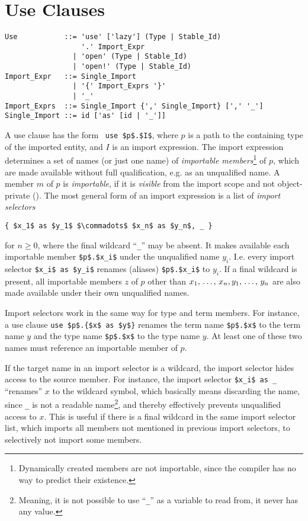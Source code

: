 \section{Use Clauses}
\label{sec:use-clauses}

\syntax\begin{lstlisting}
Use           ::= 'use' ['lazy'] (Type | Stable_Id) 
                  '.' Import_Expr
                | 'open' (Type | Stable_Id)
                | 'open!' (Type | Stable_Id)
Import_Expr   ::= Single_Import
                | '{' Import_Exprs '}'
                | '_'
Import_Exprs  ::= Single_Import {',' Single_Import} [',' '_']
Single_Import ::= id ['as' [id | '_']]
\end{lstlisting}

A use clause has the form ~\lstinline!use $p$.$I$!, where $p$ is a path to the containing type of the imported entity, and $I$ is an import expression. The import expression determines a set of names (or just one name) of {\em importable members}\footnote{Dynamically created members are not importable, since the compiler has no way to predict their existence.} of $p$, which are made available without full qualification, e.g. as an unqualified name. A member $m$ of $p$ is {\em importable}, if it is {\em visible} from the import scope and not object-private (). The most general form of an import expression is a list of {\em import selectors}
\begin{lstlisting}
{ $x_1$ as $y_1$ $\commadots$ $x_n$ as $y_n$, _ }
\end{lstlisting}
for $n \ge 0$, where the final wildcard ``\lstinline!_!'' may be absent. It makes available each importable member \lstinline!$p$.$x_i$! under the unqualified name $y_i$. I.e. every import selector \lstinline!$x_i$ as $y_i$! renames (aliases) \lstinline!$p$.$x_i$! to $y_i$. If a final wildcard is present, all importable members $z$ of $p$ other than $x_1 ,\, \ldots ,\, x_n, y_1 ,\, \ldots ,\, y_n$ are also made available under their own unqualified names. 

Import selectors work in the same way for type and term members. For instance, a use clause \lstinline!use $p$.{$x$ as $y$}! renames the term name \lstinline!$p$.$x$! to the term name $y$ and the type name \lstinline!$p$.$x$! to the type name $y$. At least one of these two names must reference an importable member of $p$. 

If the target name in an import selector is a wildcard, the import selector hides access to the source member. For instance, the import selector \lstinline!$x_i$ as _! ``renames'' $x$ to the wildcard symbol, which basically means discarding the name, since \lstinline!_! is not a readable name\footnote{Meaning, it is not possible to use ``\lstinline!_!'' as a variable to read from, it never has any value.}, and thereby effectively prevents unqualified access to $x$. This is useful if there is a final wildcard in the same import selector list, which imports all members not mentioned in previous import selectors, to selectively not import some members. 

